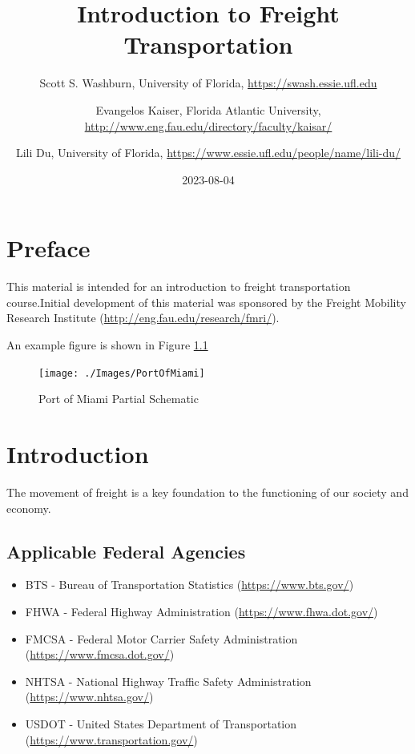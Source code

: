 \documentclass[
]{book}
\title{Introduction to Freight Transportation}
\author{Scott S. Washburn, University of Florida, \url{https://swash.essie.ufl.edu} \and Evangelos Kaiser, Florida Atlantic University, \url{http://www.eng.fau.edu/directory/faculty/kaisar/} \and Lili Du, University of Florida, \url{https://www.essie.ufl.edu/people/name/lili-du/}}
\date{2023-08-04}
\providecommand{\tightlist}{%
  \setlength{\itemsep}{0pt}\setlength{\parskip}{0pt}}
\begin{document}
\maketitle

{
\setcounter{tocdepth}{1}
\tableofcontents
}
\hypertarget{preface}{%
\chapter{Preface}\label{preface}}

This material is intended for an introduction to freight transportation course.Initial development of this material was sponsored by the Freight Mobility Research Institute (\url{http://eng.fau.edu/research/fmri/}).

An example figure is shown in Figure \ref{fig:PortImage}

\begin{figure}

{\centering \texttt{[image: ./Images/PortOfMiami]} 

}

\caption{Port of Miami Partial Schematic}\label{fig:PortImage}
\end{figure}

\hypertarget{intro}{%
\chapter{Introduction}\label{intro}}

The movement of freight is a key foundation to the functioning of our society and economy.

\hypertarget{intro-agencies}{%
\section{Applicable Federal Agencies}\label{intro-agencies}}

\begin{itemize}
\tightlist
\item
  BTS - Bureau of Transportation Statistics (\url{https://www.bts.gov/})
\item
  FHWA - Federal Highway Administration (\url{https://www.fhwa.dot.gov/})
\item
  FMCSA - Federal Motor Carrier Safety Administration (\url{https://www.fmcsa.dot.gov/})
\item
  NHTSA - National Highway Traffic Safety Administration (\url{https://www.nhtsa.gov/})
\item
  USDOT - United States Department of Transportation (\url{https://www.transportation.gov/})
\end{itemize}
\end{document}
